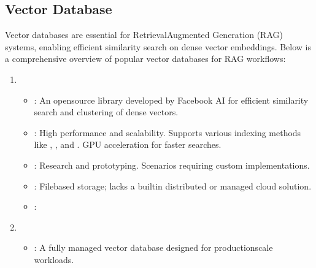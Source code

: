 \documentclass[letterpaper,11pt,english]{sphinxmanual}
\begin{document}
\subsection{Vector Database}
\label{\detokenize{rag:vector-database}}
\sphinxAtStartPar
Vector databases are essential for Retrieval\sphinxhyphen{}Augmented Generation (RAG) systems, enabling
efficient similarity search on dense vector embeddings. Below is a comprehensive overview
of popular vector databases for RAG workflows:
\begin{enumerate}
%
\item {} 
\sphinxAtStartPar
{}
\begin{itemize}
\item {} 
\sphinxAtStartPar
{}:
\sphinxhyphen{} An open\sphinxhyphen{}source library developed by Facebook AI for efficient similarity search and clustering of dense vectors.

\item {} 
\sphinxAtStartPar
{}:
\sphinxhyphen{} High performance and scalability.
\sphinxhyphen{} Supports various indexing methods like , , and .
\sphinxhyphen{} GPU acceleration for faster searches.

\item {} 
\sphinxAtStartPar
{}:
\sphinxhyphen{} Research and prototyping.
\sphinxhyphen{} Scenarios requiring custom implementations.

\item {} 
\sphinxAtStartPar
{}:
\sphinxhyphen{} File\sphinxhyphen{}based storage; lacks a built\sphinxhyphen{}in distributed or managed cloud solution.

\item {} 
\sphinxAtStartPar
{}: 

\end{itemize}

\item {} 
\sphinxAtStartPar
{}
\begin{itemize}
\item {} 
\sphinxAtStartPar
{}:
\sphinxhyphen{} A fully managed vector database designed for production\sphinxhyphen{}scale workloads.


\end{itemize}
\end{enumerate}
\end{document}
